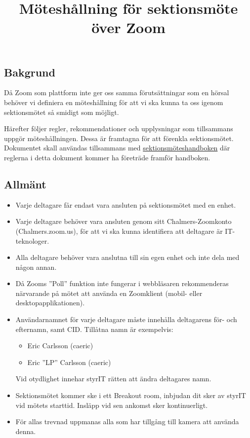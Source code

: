 \documentclass[11pt, noincludeaddress, nopagination]{classes/cthit}
\begin{document}
\title{Möteshållning för sektionsmöte över Zoom}

\makeheadfoot%

\makesimpletitle

\vspace{-20pt}
\subsection*{Bakgrund}
Då Zoom som plattform inte ger oss samma förutsättningar som en hörsal behöver vi definiera en möteshållning för att vi ska kunna ta oss igenom sektionsmötet så smidigt som möjligt.

Härefter följer regler, rekommendationer och upplysningar som tillsammans uppgör möteshållningen. Dessa är framtagna för att förenkla sektionsmötet. Dokumentet skall användas tillsammans med \href{https://styrit.chalmers.it/wp-content/uploads/sektionsmoteshandbok.pdf}{sektionsmöteshandboken} där reglerna i detta dokument kommer ha företräde framför handboken.


\subsection*{Allmänt}
\begin{itemize}
    
    \item Varje deltagare får endast vara ansluten på sektionsmötet med en enhet.
    \item Varje deltagare behöver vara ansluten genom sitt Chalmers-Zoomkonto (Chalmers.zoom.us), för att vi ska kunna identifiera att deltagare är IT-teknologer.
    \item Alla deltagare behöver vara anslutna till sin egen enhet och inte dela med någon annan.
    \item Då Zooms ''Poll'' funktion inte fungerar i webbläsaren rekommenderas närvarande på mötet att använda en Zoomklient (mobil- eller desktopapplikationen).
    \item Användarnamnet för varje deltagare måste innehålla deltagarens för- och efternamn, samt CID. Tillåtna namn är exempelvis:
    \begin{itemize}
        \item Eric Carlsson (caeric)
        \item Eric ''LP'' Carlsson (caeric)
    \end{itemize}
    Vid otydlighet innehar styrIT rätten att ändra deltagares namn.
    \item Sektionsmötet kommer ske i ett Breakout room, inbjudan dit sker av styrIT vid mötets starttid. Insläpp vid sen ankomst sker kontinuerligt.
    \item För allas trevnad uppmanas alla som har tillgång till kamera att använda denna.
\end{itemize}
\end{document}
